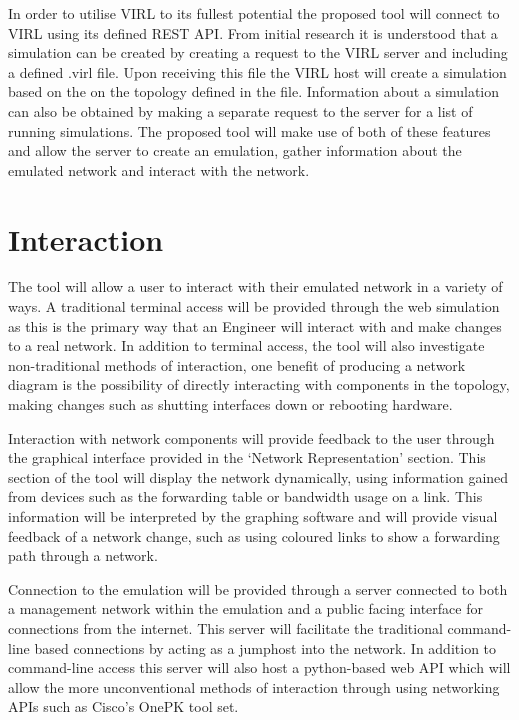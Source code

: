 \documentclass[11pt]{report}
\begin{document}
In order to utilise VIRL to its fullest potential the proposed tool will connect to VIRL using its defined REST API. From initial research it is understood that a simulation can be created by creating a request to the VIRL server and including a defined .virl file. Upon receiving this file the VIRL host will create a simulation based on the on the topology defined in the file. Information about a simulation can also be obtained by making a separate request to the server for a list of running simulations. The proposed tool will make use of both of these features and allow the server to create an emulation, gather information about the emulated network and interact with the network.

\section{Interaction}

The tool will allow a user to interact with their emulated network in a variety of ways. A traditional terminal access will be provided through the web simulation as this is the primary way that an Engineer will interact with and make changes to a real network. In addition to terminal access, the tool will also investigate non-traditional methods of interaction, one benefit of producing a network diagram is the possibility of directly interacting with components in the topology, making changes such as shutting interfaces down or rebooting hardware.

Interaction with network components will provide feedback to the user through the graphical interface provided in the `Network Representation' section. This section of the tool will display the network dynamically, using information gained from devices such as the forwarding table or bandwidth usage on a link. This information will be interpreted by the graphing software and will provide visual feedback of a network change, such as using coloured links to show a forwarding path through a network.

Connection to the emulation will be provided through a server connected to both a management network within the emulation and a public facing interface for connections from the internet. This server will facilitate the traditional command-line based connections by acting as a jumphost into the network. In addition to command-line access this server will also host a python-based web API which will allow the more unconventional methods of interaction through using networking APIs such as Cisco's OnePK tool set.
\end{document}
